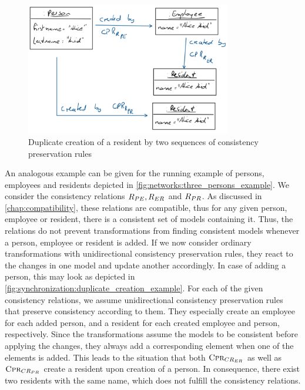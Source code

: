 \begin{figure}
    \centering
    \includegraphics[width=0.8\textwidth]{figures/correctness/synchronization/duplicate_creation_example.png}    
    \caption{Duplicate creation of a resident by two sequences of consistency preservation rules}
    \label{fig:synchronization:duplicate_creation_example}
\end{figure}

An analogous example can be given for the running example of persons, employees and residents depicted in \autoref{fig:networks:three_persons_example}.
We consider the consistency relations $R_{PE}, R_{ER}$ and $R_{PR}$.
As discussed in \autoref{chap:compatibility}, these relations are compatible, thus for any given person, employee or resident, there is a consistent set of models containing it.
Thus, the relations do not prevent transformations from finding consistent models whenever a person, employee or resident is added.
If we now consider ordinary transformations with unidirectional consistency preservation rules, they react to the changes in one model and update another accordingly.
In case of adding a person, this may look as depicted in \autoref{fig:synchronization:duplicate_creation_example}.
For each of the given consistency relations, we assume unidirectional consistency preservation rules that preserve consistency according to them.
They especially create an employee for each added person, and a resident for each created employee and person, respectively.
Since the transformations assume the models to be consistent before applying the changes, they always add a corresponding element when one of the elements is added.
This leads to the situation that both $\textsc{Cpr}_{CR_{ER}}$ as well as $\textsc{Cpr}_{CR_{PR}}$ create a resident upon creation of a person.
In consequence, there exist two residents with the same name, which does not fulfill the consistency relations.

